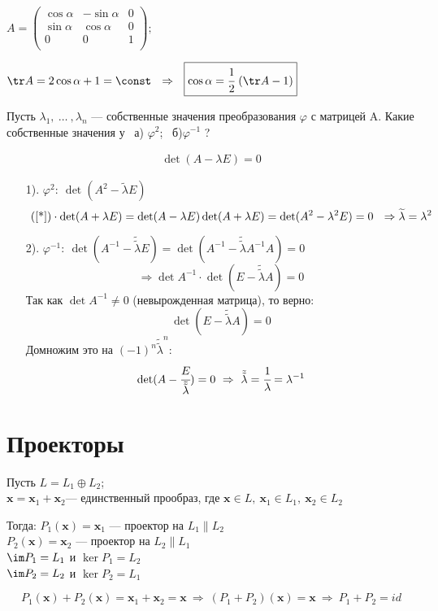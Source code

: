$A=\begin{pmatrix}
\cos \alpha & -\sin \alpha & 0\\
\sin \alpha & \cos \alpha & 0\\
0 & 0 & 1\\
\end{pmatrix};$

$\tr A=2\cos \alpha +1 = \const~~\Rightarrow ~~\boxed{\cos \alpha = \cfrac{1}{2}~ (\tr A-1)}$

\bigskip

\begin{prim}
	
Пусть $\lambda_1,~ \dots ~, \lambda_n$ --- собственные значения преобразования $\varphi$ с матрицей A. Какие собственные значения у ~а) $\varphi^2$;~ б)$\varphi^{-1}$ ?
	\end{prim}
\begin{align}
	\det(A-\lambda E)=0  \tag{*}\label{*} 
\end{align}

\begin{enumerate}
	\item[1).] $\varphi^2:~\det(A^2-\widetilde \lambda E)$\\
	$$~(\ref{*}) \cdot \det(A+\lambda E) = \det(A-\lambda E) \det(A+\lambda E)=\det(A^2-\lambda^2 E) = 0~~\Rightarrow \widetilde \lambda = \lambda^2$$
	
	\item[2).] $\varphi^{-1}:~\det(A^{-1}-\tilde {\tilde \lambda} E)= \det(A^{-1}-\tilde {\tilde \lambda} A^{-1}A)=0$
	$$\Rightarrow \det A^{-1} \cdot \det(E-\tilde {\tilde \lambda} A)=0$$
	Так как $\det A^{-1} \ne 0$ (невырожденная матрица), то верно:
	 $$\det(E-\tilde {\tilde \lambda} A)=0$$
	 Домножим это на $(-1)^n \tilde {\tilde \lambda}^n$:
	 $$\det(A-\cfrac{E}{\tilde {\tilde \lambda}})=0 ~\Rightarrow~ \tilde {\tilde \lambda}=\cfrac{1}{\lambda}=\lambda^{-1}$$
\end{enumerate}

\section{Проекторы}
Пусть $L=L_1 \oplus L_2$;\\
$\textbf{x}=\textbf{x$_1$}+\textbf{x$_2$}$--- единственный прообраз, где $\textbf{x} \in L, ~ \textbf{x$_1$} \in L_1,~ \textbf{x$_2$} \in L_2$
\begin{center}
Тогда: $P_1(\textbf{x})=\textbf{x$_1$}$ --- проектор на $L_1 \parallel L_2$\\
$P_2(\textbf{x})=\textbf{x$_2$}$ --- проектор на $L_2 \parallel L_1$\\
$\im P_1 = L_1$ и $\ker P_1=L_2$\\
$\im P_2 = L_2$ и $\ker P_2=L_1$\\
\end{center}
$$P_1(\textbf{x})+P_2(\textbf{x})=\textbf{x$_1$}+\textbf{x$_2$}=\textbf{x}~\Rightarrow ~(P_1+P_2)(\textbf{x})=\textbf{x}~ \Rightarrow ~P_1+P_2=id$$ 